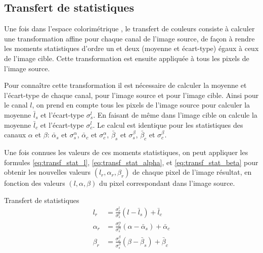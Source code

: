 \subsection{Transfert de statistiques}
\label{sec:transf_stat}

Une fois dans l'espace colorimétrique \lAB, le transfert de couleurs consiste à
calculer une transformation affine pour chaque canal de l'image source, de
façon à rendre les moments statistiques d'ordre un et deux (moyenne et
écart-type) égaux à ceux de l'image cible. Cette transformation est ensuite
appliquée à tous les pixels de l'image source.

Pour connaître cette transformation il est nécessaire de calculer la moyenne et
l'écart-type de chaque canal, pour l'image source et pour l'image cible. Ainsi
pour le canal $l$, on prend en compte tous les pixels de l'image source pour
calculer la moyenne $\bar{l}_s$ et l'écart-type $\sigma^l_s$. En faisant de
même dans l'image cible on calcule la moyenne $\bar{l}_c$ et l'écart-type
$\sigma^l_c$. Le calcul est identique pour les statistiques des canaux $\alpha$
et $\beta$: $\bar{\alpha}_s$ et $\sigma^\alpha_s$, $\bar{\alpha}_c$ et
$\sigma^\alpha_c$, $\bar{\beta}_s$ et $\sigma^\beta_s$, $\bar{\beta}_c$ et
$\sigma^\beta_c$.

Une fois connues les valeurs de ces moments statistiques, on peut appliquer les
formules \ref{eq:transf_stat_l}, \ref{eq:transf_stat_alpha}, et
\ref{eq:transf_stat_beta} pour obtenir les nouvelles valeurs $(l_r, \alpha_r,
\beta_r)$ de chaque pixel de l'image résultat, en fonction des valeurs $(l,
\alpha, \beta)$ du pixel correspondant dans l'image source.

\pagebreak

\begin{frame}{Transfert de statistiques}
  \begin{align}
    l_r &= \frac{\sigma^l_c}{\sigma^l_s}(l-\bar{l}_s) + \bar{l}_c
    \label{eq:transf_stat_l}
    \\
    \alpha_r &=
    \frac{\sigma^{\alpha}_c}{\sigma^{\alpha}_s}(\alpha-\bar{\alpha}_s)
    + \bar{\alpha}_c
    \label{eq:transf_stat_alpha}
    \\
    \beta_r &=
    \frac{\sigma^{\beta}_c}{\sigma^{\beta}_s}(\beta-\bar{\beta}_s)
    + \bar{\beta}_c
    \label{eq:transf_stat_beta}
  \end{align}
\end{frame}

